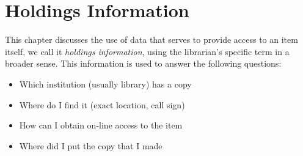 
\chapter{Holdings Information}
\label{cha:hold}

This chapter discusses the use of data that serves to provide access
to an item itself, we call it \textit{holdings information}, using the
librarian's specific term in a broader sense. This information is used
to answer the following questions:
\begin{itemize}
\item Which institution (usually library) has a copy
\item Where do I find it (exact location, call sign)
\item How can I obtain on-line access to the item
\item Where did I put the copy that I made
\end{itemize}









